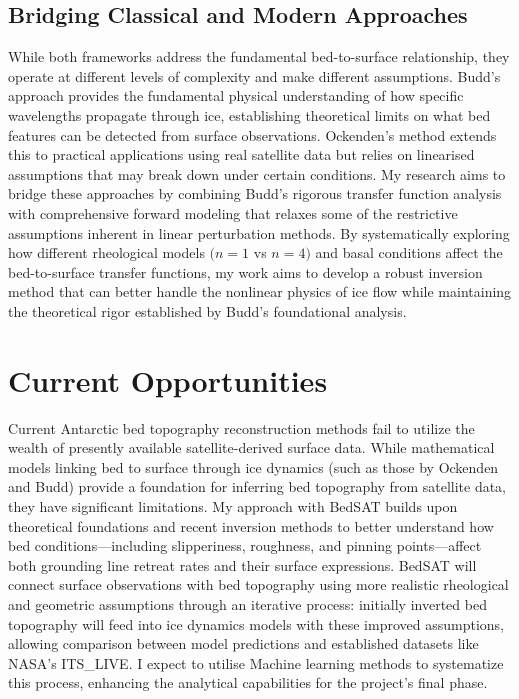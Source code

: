 \subsection{Bridging Classical and Modern Approaches}
While both frameworks address the fundamental bed-to-surface relationship, they operate at different levels of complexity and make different assumptions. Budd's approach provides the fundamental physical understanding of how specific wavelengths propagate through ice, establishing theoretical limits on what bed features can be detected from surface observations. Ockenden's method extends this to practical applications using real satellite data but relies on linearised assumptions that may break down under certain conditions. My research aims to bridge these approaches by combining Budd's rigorous transfer function analysis with comprehensive forward modeling that relaxes some of the restrictive assumptions inherent in linear perturbation methods. By systematically exploring how different rheological models $(n = 1$ vs $n = 4)$ and basal conditions affect the bed-to-surface transfer functions, my work aims to develop a robust inversion method that can better handle the nonlinear physics of ice flow while maintaining the theoretical rigor established by Budd's foundational analysis.

\section{Current Opportunities}
Current Antarctic bed topography reconstruction methods fail to utilize the wealth of presently available satellite-derived surface data. While mathematical models linking bed to surface through ice dynamics (such as those by Ockenden and Budd) provide a foundation for inferring bed topography from satellite data, they have significant limitations. My approach with BedSAT builds upon theoretical foundations and recent inversion methods to better understand how bed conditions—including slipperiness, roughness, and pinning points—affect both grounding line retreat rates and their surface expressions. BedSAT will connect surface observations with bed topography using more realistic rheological and geometric assumptions through an iterative process: initially inverted bed topography will feed into ice dynamics models with these improved assumptions, allowing comparison between model predictions and established datasets like NASA's ITS\_LIVE. I expect to utilise Machine learning methods to systematize this process, enhancing the analytical capabilities for the project's final phase.

